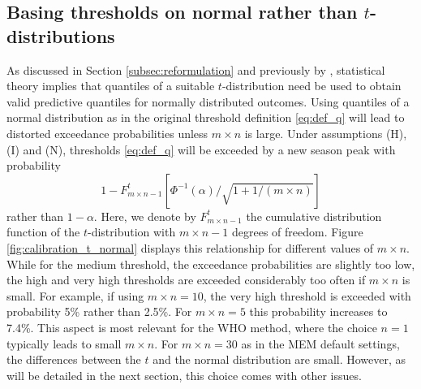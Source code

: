 \documentclass[12pt]{article}
\begin{document}
\subsection{Basing thresholds on normal rather than $t$-distributions}
\label{subsec:normal_vs_t}

As discussed in Section \ref{subsec:reformulation} and previously by \cite{Allevius2020}, statistical theory implies that quantiles of a suitable $t$-distribution need be used to obtain valid predictive quantiles for normally distributed outcomes. Using quantiles of a normal distribution as in the original threshold definition \eqref{eq:def_q} will lead to distorted exceedance probabilities unless $m \times n$ is large. Under assumptions (H), (I) and (N), thresholds \eqref{eq:def_q} will be exceeded by a new season peak with probability
$$
1 - F^t_{m\times n - 1}\left[\Phi^{-1}(\alpha)/\sqrt{1 + 1/(m \times n)}\right]
$$
rather than $1 - \alpha$. Here, we denote by $F^t_{m\times n - 1}$ the cumulative distribution function of the $t$-distribution with $m \times n - 1$ degrees of freedom. Figure \ref{fig:calibration_t_normal} displays this relationship for different values of $m \times n$. While for the medium threshold, the exceedance probabilities are slightly too low, the high and very high thresholds are exceeded considerably too often if $m \times n$ is small. For example, if using $m \times n = 10$, the very high threshold is exceeded with probability 5\% rather than 2.5\%. For $m \times n = 5$ this probability increases to 7.4\%. This aspect is most relevant for the WHO method, where the choice $n = 1$ typically leads to small $m \times n$. For $m \times n = 30$ as in the MEM default settings, the differences between the $t$ and the normal distribution are small. However, as will be detailed in the next section, this choice comes with other issues.
\end{document}
